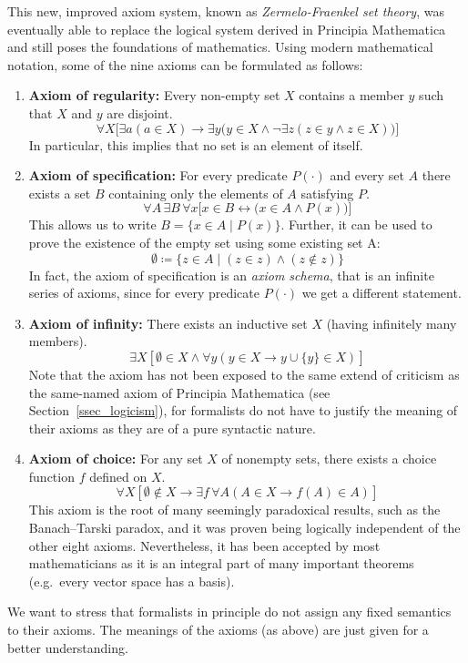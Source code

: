 \documentclass{article}
\begin{document}
This new, improved axiom system, known as \textit{Zermelo-Fraenkel set theory}, was eventually able to replace the logical system derived in Principia Mathematica and still poses the foundations of mathematics. Using modern mathematical notation, some of the nine axioms can be formulated as follows:
\small
\begin{enumerate}
    \item \textbf{Axiom of regularity:} Every non-empty set $X$ contains a member $y$ such that $X$ and $y$ are disjoint.
\begin{equation*}
\forall X \bigl[\exists a ( a \in X) \rightarrow \exists y \bigl( y \in X \land \lnot \exists z (z \in y \land z \in X)\bigr)\bigr]
\end{equation*}
In particular, this implies that no set is an element of itself.
    \item \textbf{Axiom of specification:} For every predicate $P(\cdot)$ and every set $A$ there exists a set $B$ containing only the elements of $A$ satisfying $P$.
\begin{equation*}
\forall A\,\exists B\,\forall x\bigl[x\in B \leftrightarrow \bigl(x\in A \land P(x)\bigr)\bigr]
\end{equation*}
This allows us to write $B=\{x\in A\mid P(x)\}$. Further, it can be used to prove the existence of the empty set using some existing set A:
\begin{equation*}
\emptyset\coloneqq\{z\in A\mid (z\in z)\land(z\notin z)\}
\end{equation*}
In fact, the axiom of specification is an \textit{axiom schema}, that is an infinite series of axioms, since for every predicate $P(\cdot)$ we get a different statement.
    \item \textbf{Axiom of infinity:} There exists an inductive set $X$ (having infinitely many members).
\begin{equation*}
\exists X \left [\emptyset \in X \land \forall y (y \in X \rightarrow y\cup\{y\}  \in X)\right]
\end{equation*}
Note that the axiom has not been exposed to the same extend of criticism as the same-named axiom of Principia Mathematica (see Section~\ref{ssec_logicism}), for formalists do not have to justify the meaning of their axioms as they are of a pure syntactic nature.
    \item \textbf{Axiom of choice:} For any set $X$ of nonempty sets, there exists a choice function $f$ defined on $X$. 
\begin{equation*}
\forall X \left[ \emptyset \notin X \rightarrow \exists f\,\forall A(A\in X\rightarrow f(A) \in A ) \right]
\end{equation*}
This axiom is the root of many seemingly paradoxical results, such as the Banach–Tarski paradox, and it was proven being logically independent of the other eight axioms. Nevertheless, it has been accepted by most mathematicians as it is an integral part of many important theorems (e.g.\ every vector space has a basis).
\end{enumerate}
\normalsize
We want to stress that formalists in principle do not assign any fixed semantics to their axioms. The meanings of the axioms (as above) are just given for a better understanding.
\end{document}
